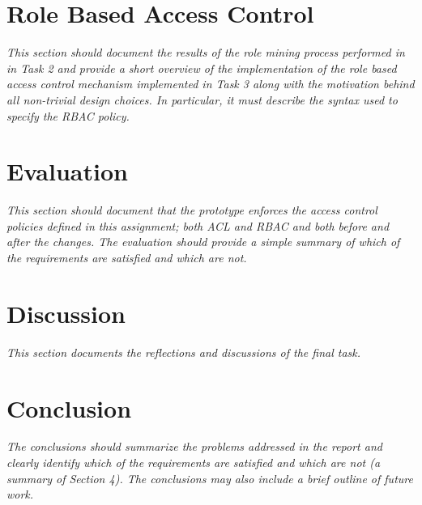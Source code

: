 \documentclass[12pt]{article}
\begin{document}
\newpage

\section{Role Based Access Control}
\label{sec:Role Based Access Control}

\textit{This section should document the results of the role mining process performed in in Task 2 and provide a short overview of the implementation of the role based access control mechanism implemented in Task 3 along with the motivation behind all non-trivial design choices. In particular, it must describe the syntax used to specify the RBAC policy.}

\newpage

\section{Evaluation}
\label{sec:Evaluation}

\textit{This section should document that the prototype enforces the access control policies defined in this assignment; both ACL and RBAC and both before and after the changes. The evaluation should provide a simple summary of which of the requirements are satisfied and which are not.}

\newpage

\section{Discussion}
\label{sec:Discussion}

\textit{This section documents the reflections and discussions of the final task.}

\newpage

\section{Conclusion}
\label{sec:Conclusion}

\textit{The conclusions should summarize the problems addressed in the report and clearly identify which of the requirements are satisfied and which are not (a summary of Section 4). The conclusions may also include a brief outline of future work.}
\end{document}
